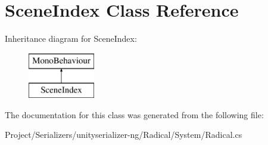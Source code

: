 \hypertarget{class_scene_index}{}\section{Scene\+Index Class Reference}
\label{class_scene_index}
Inheritance diagram for Scene\+Index\+:\begin{figure}[H]
\begin{center}
\leavevmode
\includegraphics[height=2.000000cm]{class_scene_index}
\end{center}
\end{figure}


The documentation for this class was generated from the following file\+:\begin{DoxyCompactItemize}
\item 
Project/\+Serializers/unityserializer-\/ng/\+Radical/\+System/Radical.\+cs\end{DoxyCompactItemize}
